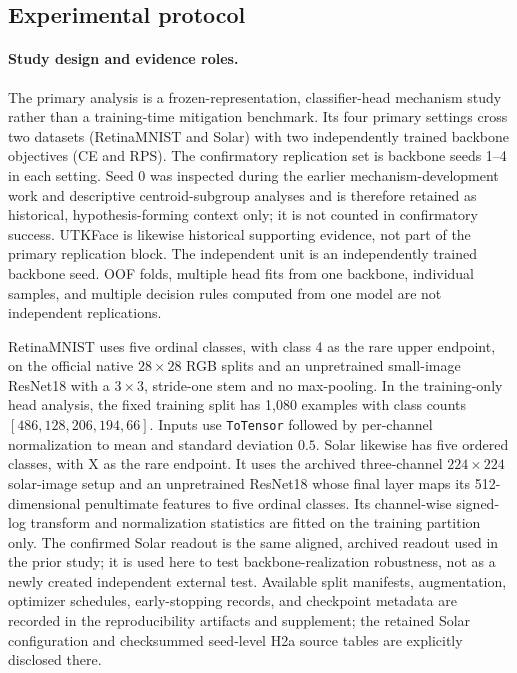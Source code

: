 \subsection{Experimental protocol}

\paragraph{Study design and evidence roles.}
The primary analysis is a frozen-representation, classifier-head mechanism study rather than a training-time mitigation benchmark. Its four primary settings cross two datasets (RetinaMNIST and Solar) with two independently trained backbone objectives (CE and RPS). The confirmatory replication set is backbone seeds 1--4 in each setting. Seed 0 was inspected during the earlier mechanism-development work and descriptive centroid-subgroup analyses and is therefore retained as historical, hypothesis-forming context only; it is not counted in confirmatory success. UTKFace is likewise historical supporting evidence, not part of the primary replication block. The independent unit is an independently trained backbone seed. OOF folds, multiple head fits from one backbone, individual samples, and multiple decision rules computed from one model are not independent replications.

RetinaMNIST uses five ordinal classes, with class 4 as the rare upper endpoint, on the official native \(28\times28\) RGB splits and an unpretrained small-image ResNet18 with a \(3\times3\), stride-one stem and no max-pooling. In the training-only head analysis, the fixed training split has 1,080 examples with class counts \([486,128,206,194,66]\). Inputs use \texttt{ToTensor} followed by per-channel normalization to mean and standard deviation \(0.5\). Solar likewise has five ordered classes, with X as the rare endpoint. It uses the archived three-channel \(224\times224\) solar-image setup and an unpretrained ResNet18 whose final layer maps its 512-dimensional penultimate features to five ordinal classes. Its channel-wise signed-log transform and normalization statistics are fitted on the training partition only. The confirmed Solar readout is the same aligned, archived readout used in the prior study; it is used here to test backbone-realization robustness, not as a newly created independent external test. Available split manifests, augmentation, optimizer schedules, early-stopping records, and checkpoint metadata are recorded in the reproducibility artifacts and supplement; the retained Solar configuration and checksummed seed-level H2a source tables are explicitly disclosed there.

